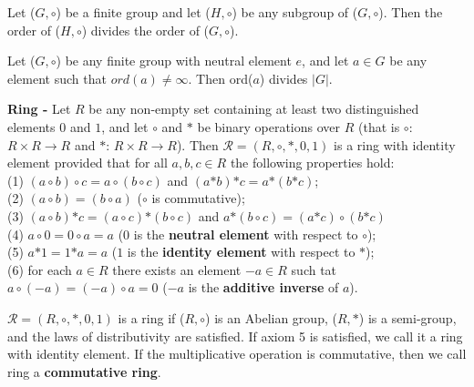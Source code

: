 \documentclass[a4paper]{article}
\begin{document}
\begin{theorem}
Let ($G, \circ$) be a finite group and let ($H, \circ$) be any subgroup of ($G, \circ$). Then the order of ($H, \circ$) divides the order of ($G, \circ$).
\end{theorem}


\begin{corollary}
Let ($G, \circ$) be any finite group with neutral element $e$, and let $a \in G$ be any element such that $ord(a) \neq \infty$. Then ord($a$) divides $|G|$.
\end{corollary}


\begin{definition}
\textbf{Ring -} Let $R$ be any non-empty set containing at least two distinguished elements $0$ and $1$, and let $\circ$ and $\mathcal{*}$ be binary operations over $R$ (that is $\circ$: $R \times R \to R$ and $\mathcal{*}$: $R \times R \to R$). Then $\mathcal{R} =(R, \circ, \mathcal{*}, 0, 1)$ is a ring with identity element provided that for all $a,b,c \in R$ the following properties hold:\\
(1) $(a \circ b) \circ c = a \circ (b \circ c)$ and $(a \mathcal{*} b) \mathcal{*} c = a \mathcal{*} (b \mathcal{*} c)$;\\
(2) $(a \circ b) = (b \circ a)$ ($\circ$ is commutative);\\
(3) $(a \circ b) \mathcal{*} c = (a \circ c) \mathcal{*} (b \circ c)$ and $a \mathcal{*} (b \circ c) = (a \mathcal{*} c) \circ (b \mathcal{*} c)$\\
(4) $a \circ 0 = 0 \circ a = a$ ($0$ is the \textbf{neutral element} with respect to $\circ$);\\
(5) $a \mathcal{*} 1 = 1 \mathcal{*} a = a$ ($1$ is the \textbf{identity element} with respect to $\mathcal{*}$);\\
(6) for each $a \in R$ there exists an element $-a \in R$ such tat $a \circ (-a) = (-a) \circ a = 0$ ($-a$ is the \textbf{additive inverse} of $a$).
\end{definition}
$\mathcal{R} =(R, \circ, \mathcal{*}, 0, 1)$ is a ring if ($R, \circ$) is an Abelian group, ($R, \mathcal{*}$) is a semi-group, and the laws of distributivity are satisfied. If axiom 5 is satisfied, we call it a ring with identity element. If the multiplicative operation is commutative, then we call ring a \textbf{commutative ring}.
\end{document}
